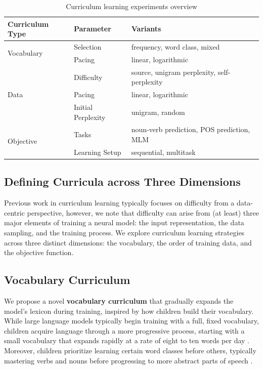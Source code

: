 \begin{table}[H]
    \centering
    \small
    \begin{tabular}{lll}
    \toprule
    \textbf{Curriculum Type} & \textbf{Parameter} &\textbf{Variants} \\
    \midrule
     \multirow{2}{*}{Vocabulary} & Selection & frequency, word class, mixed \\
     & Pacing & linear, logarithmic \\
     \midrule
     \multirow{3}{*}{Data} & Difficulty & source, unigram perplexity, self-perplexity \\
     & Pacing & linear, logarithmic \\
     & Initial Perplexity & unigram, random \\
      \midrule
     \multirow{2}{*}{Objective} & Tasks & noun-verb prediction, POS prediction, MLM\\
     & Learning Setup & sequential, multitask \\
    \bottomrule
    \end{tabular}
    \caption{\label{tbl:configurations} Curriculum learning experiments overview}
\end{table}

\subsection{Defining Curricula across Three Dimensions}
Previous work in curriculum learning typically focuses on difficulty from a data-centric perspective, however, we note that difficulty can arise from (at least) three major elements of training a neural model: the input representation, the data sampling, and the training process. We explore curriculum learning strategies across three distinct dimensions: the vocabulary, the order of training data, and the objective function.

\subsection{Vocabulary Curriculum}
\label{subsec:vocab-cl}

We propose a novel \textbf{vocabulary curriculum} that gradually expands the model's lexicon during training, inspired by how children build their vocabulary. While large language models typically begin training with a full, fixed vocabulary, children acquire language through a more progressive process, starting with a small vocabulary that expands rapidly at a rate of eight to ten words per day \cite{weizman2001lexical}. Moreover, children prioritize learning certain word classes before others, typically mastering verbs and nouns before progressing to more abstract parts of speech \cite{bergelson2015early}.

